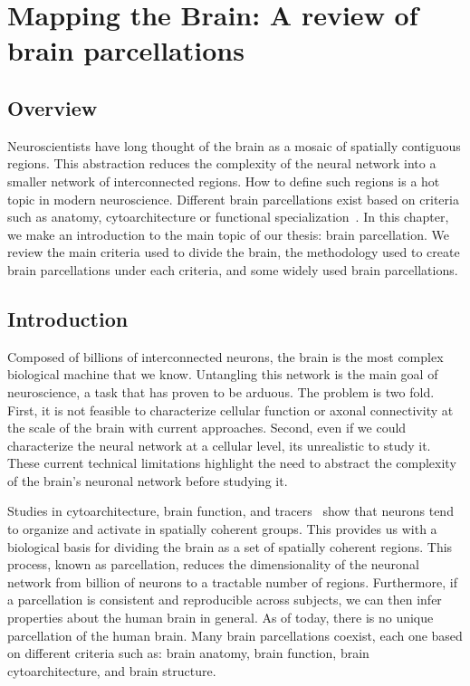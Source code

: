 \chapter{Mapping the Brain: A review of brain parcellations}
\label{ch:brain_mapping}

\section{Overview}
Neuroscientists have long thought of the brain as a mosaic of spatially contiguous
regions. This abstraction reduces the complexity of the neural network into a smaller
network of interconnected regions. How to define such regions is a hot topic
in modern neuroscience. Different brain parcellations exist based on criteria
such as anatomy, cytoarchitecture or functional specialization~\cite{Brodmann1909, Collins1998, Yeo2011}.
In this chapter, we make an introduction to the main topic of our thesis: brain
parcellation. We review the main criteria used to divide the brain, the methodology
used to create brain parcellations under each criteria, and some widely used
brain parcellations.

\section{Introduction}
Composed of billions of interconnected neurons, the brain is the most complex
biological machine that we know. Untangling this network is the main goal of
neuroscience, a task that has proven to be arduous. The problem is two fold.
First, it is not feasible to characterize cellular function or axonal
connectivity at the scale of the brain with current approaches. Second, even
if we could characterize the neural network at a cellular level, its unrealistic to study it.
These current technical limitations highlight the need to abstract the complexity
of the brain's neuronal network before studying it.

Studies in cytoarchitecture\cite{Meynert1872, Brodmann1909, VonEconomo1925}, brain
function\cite{Penfield1954, VonderMalsburg1994}, and tracers~\cite{Schmahmann2006, Stephan2013}
show that neurons tend to organize and activate in spatially coherent groups.
This provides us with a biological basis for dividing the brain as a set of spatially
coherent regions. This process, known as parcellation, reduces the dimensionality
of the neuronal network from billion of neurons to a tractable number of regions.
Furthermore, if a parcellation is consistent and reproducible across subjects,
we can then infer properties about the human brain in general. As of today,
there is no unique parcellation of the human brain. Many brain parcellations
coexist, each one based on different criteria such as: brain anatomy, brain
function, brain cytoarchitecture, and brain structure. 


